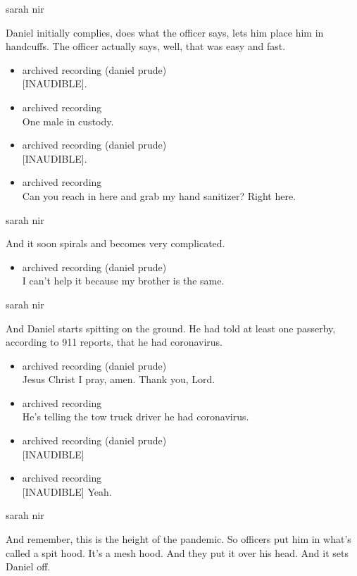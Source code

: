 sarah nir

Daniel initially complies, does what the officer says, lets him place
him in handcuffs. The officer actually says, well, that was easy and
fast.

\begin{itemize}
\item
  archived recording (daniel prude)\\
  {[}INAUDIBLE{]}.
\item
  archived recording\\
  One male in custody.
\item
  archived recording (daniel prude)\\
  {[}INAUDIBLE{]}.
\item
  archived recording\\
  Can you reach in here and grab my hand sanitizer? Right here.
\end{itemize}

sarah nir

And it soon spirals and becomes very complicated.

\begin{itemize}
\tightlist
\item
  archived recording (daniel prude)\\
  I can't help it because my brother is the same.
\end{itemize}

sarah nir

And Daniel starts spitting on the ground. He had told at least one
passerby, according to 911 reports, that he had coronavirus.

\begin{itemize}
\item
  archived recording (daniel prude)\\
  Jesus Christ I pray, amen. Thank you, Lord.
\item
  archived recording\\
  He's telling the tow truck driver he had coronavirus.
\item
  archived recording (daniel prude)\\
  {[}INAUDIBLE{]}
\item
  archived recording\\
  {[}INAUDIBLE{]} Yeah.
\end{itemize}

sarah nir

And remember, this is the height of the pandemic. So officers put him in
what's called a spit hood. It's a mesh hood. And they put it over his
head. And it sets Daniel off.

